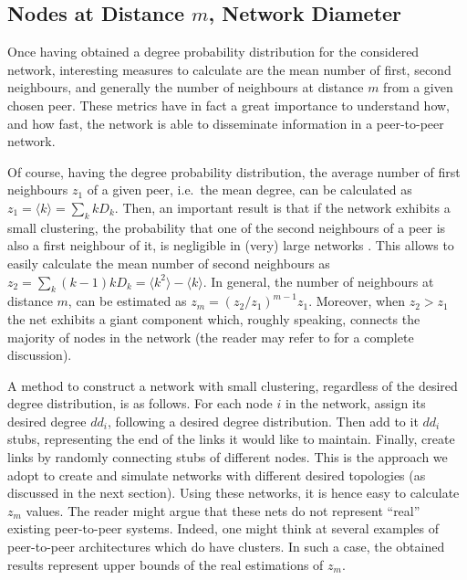 \documentclass[a4paper,twosided]{article}
\begin{document}
\subsection{Nodes at Distance $m$, Network Diameter}
\label{sec:mean_neigh}

Once having obtained a degree probability distribution for the considered network, interesting measures to calculate are the mean number of first, second neighbours, and generally the number of neighbours at distance $m$ from a given chosen peer. These metrics have in fact a great importance to understand how, and how fast, the network is able to disseminate information in a peer-to-peer network.

Of course, having the degree probability distribution, the average number of first neighbours $z_1$ of a given peer, i.e.~the mean degree, can be calculated as $z_1 = \langle k \rangle = \sum_k k D_k$. 
Then, an important result is that if the network exhibits a small clustering, the probability that one of the second neighbours of a peer is also a first neighbour of it, is negligible in (very) large networks \cite{newmanHandbook}. This allows to easily calculate the mean number of second neighbours as $z_2 = \sum_k (k-1)k D_k = \langle k^2 \rangle - \langle k \rangle$. In general, the number of neighbours at distance $m$, can be estimated as $z_m = (z_2 / z_1)^{m-1}z_1$. Moreover, when $z_2 > z_1$ the net exhibits a giant component which, roughly speaking, connects the majority of nodes in the network (the reader may refer to \cite{newmanHandbook} for a complete discussion).

A method to construct a network with small clustering, regardless of the desired degree distribution, is as follows. For each node $i$ in the network, assign its desired degree $dd_i$, following a desired degree distribution. Then add to it $dd_i$ stubs, representing the end of the links it would like to maintain. Finally, create links by randomly connecting stubs of different nodes. This is the approach we adopt to create and simulate networks with different desired topologies (as discussed in the next section). Using these networks, it is hence easy to calculate $z_m$ values. The reader might argue that these nets do not represent ``real'' existing peer-to-peer systems. Indeed, one might think at several examples of peer-to-peer architectures which do have clusters. In such a case, the obtained results represent upper bounds of the real estimations of $z_m$. 
\end{document}
